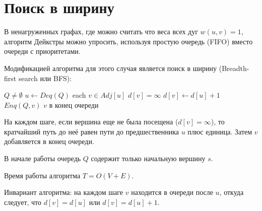 \documentclass[11pt]{article}
\begin{document}
\section{Поиск в ширину}
В ненагруженных графах, где можно считать что веса всех дуг $w(u, v) = 1$, алгоритм Дейкстры можно упросить, используя простую очередь (FIFO) вместо очереди с приоритетами.

Модификацией алгоритма для этого случая является поиск в ширину (Breadth-first search или BFS):
\begin{codebox}
\li \While $Q \neq \emptyset$
\li     \Do $u \gets Deq(Q)$
\li         \For each $v \in Adj[u]$
\li             \Do \If $d[v] = \infty$
\li                 \Then $d[v] \gets d[u] + 1$
\li                       $Enq(Q, v)$ \Comment $v$ в конец очереди
                    \End
            \End
    \End
\end{codebox}
На каждом шаге, если вершина еще не была посещена ($d[v] = \infty$), то кратчайший путь до неё равен пути до предшественника $u$ плюс единица. Затем $v$ добавляется в конец очереди.

В начале работы очередь $Q$ содержит только начальную вершину $s$.

Время работы алгоритма $T = O(V+E)$.

Инвариант алгоритма: на каждом шаге $v$ находится в очереди после $u$, откуда следует, что $d[v] = d[u]$ или $d[v] = d[u] +1$.
\end{document}
